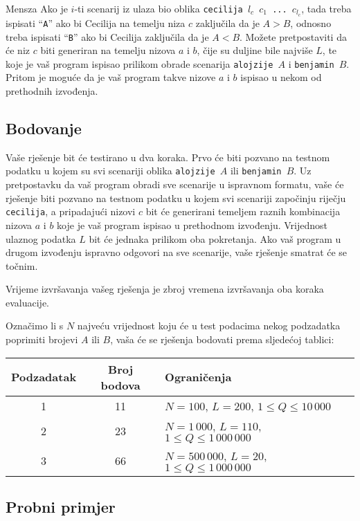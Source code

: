 \begin{statement}[
  problempoints=100,
  timelimit=1 sekunda,
  memorylimit=512 MiB,
]{Mensza}
Ako je $i$-ti scenarij iz ulaza bio oblika \texttt{cecilija $l_c$ $c_1$ ...
$c_{l_c}$}, tada treba ispisati ``\texttt{A}'' ako bi Cecilija na temelju niza
$c$ zaključila da je $A > B$, odnosno treba ispisati ``\texttt{B}'' ako bi Cecilija
zaključila da je $A < B$. Možete pretpostaviti da će niz $c$ biti generiran na
temelju nizova $a$ i $b$, čije su duljine bile najviše $L$, te  koje je vaš
program ispisao prilikom obrade scenarija \texttt{alojzije $A$} i
\texttt{benjamin $B$}. Pritom je moguće da je vaš program takve nizove $a$ i $b$
ispisao u nekom od prethodnih izvođenja.

\subsection*{Bodovanje}
Vaše rješenje bit će testirano u dva koraka. Prvo će biti pozvano na testnom
podatku u kojem su svi scenariji oblika \texttt{alojzije $A$} ili
\texttt{benjamin $B$}. Uz pretpostavku da vaš program obradi sve scenarije u
ispravnom formatu, vaše će rješenje biti pozvano na testnom podatku u kojem
svi scenariji započinju riječju \texttt{cecilija}, a pripadajući nizovi $c$
bit će generirani temeljem raznih kombinacija nizova $a$ i $b$ koje je vaš
program ispisao u prethodnom izvođenju. Vrijednost ulaznog podatka $L$ bit će
jednaka prilikom oba pokretanja. Ako vaš program u drugom izvođenju ispravno
odgovori na sve scenarije, vaše rješenje smatrat će se točnim.

Vrijeme izvršavanja vašeg rješenja je zbroj vremena izvršavanja
oba koraka evaluacije.

Označimo li s $N$ najveću vrijednost koju će u test podacima nekog podzadatka
poprimiti brojevi $A$ ili $B$, vaša će se rješenja bodovati prema sljedećoj
tablici:

{\renewcommand{\arraystretch}{1.4}
  \setlength{\tabcolsep}{6pt}
  \begin{tabular}{ccl}
   Podzadatak & Broj bodova & Ograničenja \\ \midrule
    1 & 11 & $N = 100$, $L = 200$, $1 \le Q \le 10\,000$ \\
    2 & 23 & $N = 1\,000$, $L = 110$, $1 \le Q \le 1\,000\,000$ \\
    3 & 66 & $N = 500\,000$, $L = 20$, $1 \le Q \le 1\,000\,000$
\end{tabular}}

\subsection*{Probni primjer}

\end{statement}
